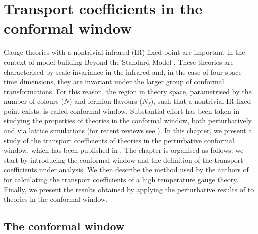 \chapter{Transport coefficients in the conformal window}
\label{CW}

Gauge theories with a nontrivial infrared (IR) fixed point are important in the context of model building Beyond the Standard Model \cite{Sannino:2008ha}. These theories are characterised by scale invariance in the infrared and, in the case of four space-time dimensions, they are invariant under the larger group of conformal transformations. For this reason, the region in theory space, parametrised by the number of colours ($N$) and fermion flavours ($N_f$), such that a nontrivial IR fixed point exists, is called conformal window.
Substantial effort has been taken in studying the properties of theories in the conformal window, both perturbatively  \cite{Ryttov:2010iz,Pica:2010xq,Mojaza:2012zd,Ryttov:2013hka,Ryttov:2013ura,Ryttov:2014nda,Ryttov:2016ner,Ryttov:2016asb,Ryttov:2016hal,Ryttov:2017toz,Ryttov:2017dhd,Ryttov:2017kmx} and via lattice simulations (for recent reviews see \cite{Svetitsky:2017xqk,Pica:2017gcb}). In this chapter, we present a study of the transport coefficients of theories in the perturbative conformal window, which has been published in \cite{Toniato:2016twr}. 
The chapter is organised as follows: we start by introducing the conformal window and the definition of the transport coefficients under analysis. We then describe the method used by the authors of \cite{Arnold:2000dr} for calculating the transport coefficients of a high temperature gauge theory. Finally, we present the results obtained by applying the perturbative results of \cite{Arnold:2000dr} to theories in the conformal window.  


\section{The conformal window}
\label{ conformal_window}


